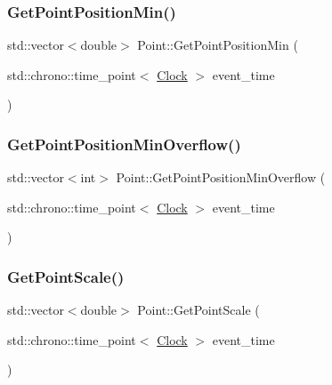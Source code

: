 \mbox{\label{classPoint_a6182865226595813eccadbe25d38cd9e}} 
\subsubsection{\texorpdfstring{Get\+Point\+Position\+Min()}{GetPointPositionMin()}}
{\footnotesize\ttfamily std\+::vector$<$double$>$ Point\+::\+Get\+Point\+Position\+Min (\begin{DoxyParamCaption}\item[{std\+::chrono\+::time\+\_\+point$<$ \mbox{\hyperlink{universe_8h_a0ef8d951d1ca5ab3cfaf7ab4c7a6fd80}{Clock}} $>$}]{event\+\_\+time }\end{DoxyParamCaption})\hspace{0.3cm}{\ttfamily [inline]}}

\mbox{\label{classPoint_a3a0caf079555585799754b3cab12129c}} 
\subsubsection{\texorpdfstring{Get\+Point\+Position\+Min\+Overflow()}{GetPointPositionMinOverflow()}}
{\footnotesize\ttfamily std\+::vector$<$int$>$ Point\+::\+Get\+Point\+Position\+Min\+Overflow (\begin{DoxyParamCaption}\item[{std\+::chrono\+::time\+\_\+point$<$ \mbox{\hyperlink{universe_8h_a0ef8d951d1ca5ab3cfaf7ab4c7a6fd80}{Clock}} $>$}]{event\+\_\+time }\end{DoxyParamCaption})\hspace{0.3cm}{\ttfamily [inline]}}

\mbox{\label{classPoint_acdd393f39d8c08aff1e866ce1c5585e5}} 
\subsubsection{\texorpdfstring{Get\+Point\+Scale()}{GetPointScale()}}
{\footnotesize\ttfamily std\+::vector$<$double$>$ Point\+::\+Get\+Point\+Scale (\begin{DoxyParamCaption}\item[{std\+::chrono\+::time\+\_\+point$<$ \mbox{\hyperlink{universe_8h_a0ef8d951d1ca5ab3cfaf7ab4c7a6fd80}{Clock}} $>$}]{event\+\_\+time }\end{DoxyParamCaption})\hspace{0.3cm}{\ttfamily [inline]}}

